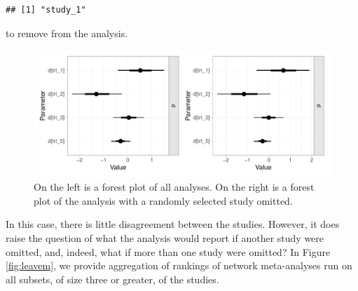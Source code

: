 \documentclass[12pt]{article}\usepackage[]{graphicx}\usepackage[]{color}
\makeatletter
\def\maxwidth{ %
  \ifdim\Gin@nat@width>\linewidth
    \linewidth
  \else
    \Gin@nat@width
  \fi
}
\newenvironment{kframe}{%
 \def\at@end@of@kframe{}%
 \ifinner\ifhmode%
  \def\at@end@of@kframe{\end{minipage}}%
  \begin{minipage}{\columnwidth}%
 \fi\fi%
 \def\FrameCommand##1{\hskip\@totalleftmargin \hskip-\fboxsep
 \colorbox{shadecolor}{##1}\hskip-\fboxsep
     \hskip-\linewidth \hskip-\@totalleftmargin \hskip\columnwidth}%
 \MakeFramed {\advance\hsize-\width
   \@totalleftmargin\z@ \linewidth\hsize
   \@setminipage}}%
 {\par\unskip\endMakeFramed%
 \at@end@of@kframe}
\newenvironment{knitrout}{}{} %
\makeatother
\begin{document}
\begin{knitrout}
\color{fgcolor}\begin{kframe}
\begin{verbatim}
## [1] "study_1"
\end{verbatim}
\end{kframe}
\end{knitrout}

to remove from the analysis.

\begin{figure}
\begin{knitrout}
\color{fgcolor}
\includegraphics[width=\maxwidth]{figure/forest-1} 

\end{knitrout}

\caption{On the left is a forest plot of all analyses. On the right is a forest plot of the analysis with a randomly selected study omitted.}
\label{fig:one}
\end{figure}

In this case, there is little disagreement between the studies. However, it does raise the question of what the analysis would report if another study were omitted, and, indeed, what if more than one study were omitted? In Figure \ref{fig:leavem}, we provide aggregation of rankings of network meta-analyses run on all subsets, of size three or greater, of the studies.
\end{document}
